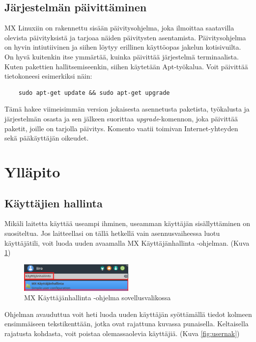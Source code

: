\documentclass[a4paper, 12pt, finnish]{article}
\begin{document}
\subsection{Järjestelmän päivittäminen}
MX Linuxiin on rakennettu sisään päivitysohjelma, joka ilmoittaa saatavilla olevista päivityksistä ja tarjoaa näiden päivitysten asentamista. Päivitysohjelma on hyvin intiutiivinen ja siihen löytyy erillinen käyttöopas jakelun kotisivuilta. On hyvä kuitenkin itse ymmärtää, kuinka päivittää järjestelmä terminaalista. Kuten pakettien hallitsemiseenkin, siihen käytetään Apt-työkalua. Voit päivittää tietokoneesi esimerkiksi näin:
\begin{lstlisting}
    sudo apt-get update && sudo apt-get upgrade
\end{lstlisting}
Tämä hakee viimeisimmän version jokaisesta asennetusta paketista, työkalusta ja järjestelmän osasta ja sen jälkeen suorittaa \textit{upgrade}-komennon, joka päivittää paketit, joille on tarjolla päivitys. Komento vaatii toimivan Internet-yhteyden sekä pääkäyttäjän oikeudet.

\section{Ylläpito}
\subsection{Käyttäjien hallinta}
Mikäli laitetta käyttää useampi ihminen, useamman käyttäjän sisällyttäminen on suositeltua. Jos laitteellasi on tällä hetkellä vain asennusvaiheessa luotu käyttäjätili, voit luoda uuden avaamalla MX Käyttäjänhallinta -ohjelman. (Kuva \ref{fig:hallinta})

\begin{figure}[htpb]
    \begin{center}
        \includegraphics[width=0.5\textwidth]{user/set}
        \caption{MX Käyttäjänhallinta -ohjelma sovellusvalikossa}
        \label{fig:hallinta}
    \end{center}
\end{figure}

Ohjelman avauduttua voit heti luoda uuden käyttäjän syöttämällä tiedot kolmeen ensimmäiseen tekstikenttään, jotka ovat rajattuna kuvassa punaisella. Keltaisella rajatusta kohdasta, voit poistaa olemassaolevia käyttäjiä. (Kuva \ref{fig:usernak})
 
\end{document}
